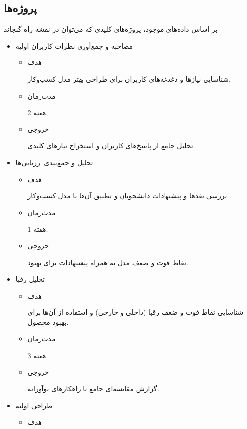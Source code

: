 \documentclass[dvipsnames, svgnames, x11names, 11pt]{article}
\begin{document}
\subsection{پروژه‌ها}
بر اساس داده‌های موجود، پروژه‌های کلیدی که می‌توان در نقشه راه گنجاند
\begin{itemize}
\item 
مصاحبه و جمع‌آوری نظرات کاربران اولیه
\begin{itemize}
\item 
هدف

شناسایی نیازها و دغدغه‌های کاربران برای طراحی بهتر مدل کسب‌وکار.

\item 
مدت‌زمان

2 هفته.

\item 
خروجی

تحلیل جامع از پاسخ‌های کاربران و استخراج نیازهای کلیدی.
\end{itemize}

\item 
تحلیل و جمع‌بندی ارزیابی‌ها
\begin{itemize}
\item 
هدف

بررسی نقدها و پیشنهادات دانشجویان و تطبیق آن‌ها با مدل کسب‌وکار.

\item 
مدت‌زمان

1 هفته.

\item 
خروجی

نقاط قوت و ضعف مدل به همراه پیشنهادات برای بهبود.
\end{itemize}

\item 
تحلیل رقبا
\begin{itemize}
\item 
هدف

شناسایی نقاط قوت و ضعف رقبا (داخلی و خارجی) و استفاده از آن‌ها برای بهبود محصول.

\item 
مدت‌زمان

3 هفته.

\item 
خروجی

گزارش مقایسه‌ای جامع با راهکارهای نوآورانه.
\end{itemize}

\item 
طراحی اولیه 
\begin{itemize}
\item 
هدف


\end{itemize}
\end{itemize}
\end{document}
